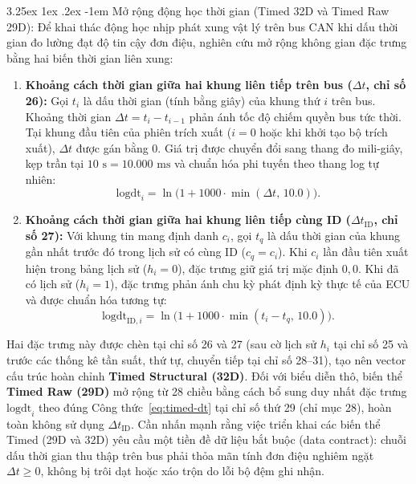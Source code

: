 \documentclass[12pt, a4paper, reqno, oneside]{book}
\makeatletter
\renewcommand\paragraph{\@startsection{paragraph}{5}{\z@}%
  {3.25ex \@plus1ex \@minus.2ex}%
  {-1em}%
  {\normalfont\normalsize\bfseries}}
\makeatother
\begin{document}
\paragraph{Mở rộng động học thời gian (Timed 32D và Timed Raw 29D):}\label{subsec:timed-features-def}
Để khai thác động học nhịp phát xung vật lý trên bus CAN khi dấu thời gian đo lường đạt độ tin cậy đơn điệu, nghiên cứu mở rộng không gian đặc trưng bằng hai biến thời gian liên xung:
\begin{enumerate}
    \item \textbf{Khoảng cách thời gian giữa hai khung liên tiếp trên bus ($\Delta t$, chỉ số 26):} Gọi $t_i$ là dấu thời gian (tính bằng giây) của khung thứ $i$ trên bus. Khoảng thời gian $\Delta t = t_i - t_{i-1}$ phản ánh tốc độ chiếm quyền bus tức thời. Tại khung đầu tiên của phiên trích xuất ($i=0$ hoặc khi khởi tạo bộ trích xuất), $\Delta t$ được gán bằng $0$. Giá trị được chuyển đổi sang thang đo mili-giây, kẹp trần tại $10\text{ s} = 10.000\text{ ms}$ và chuẩn hóa phi tuyến theo thang log tự nhiên:
    \begin{equation}\label{eq:timed-dt}
    \text{logdt}_i = \ln\big(1 + 1000 \cdot \min(\Delta t,\, 10.0)\big).
    \end{equation}
    \item \textbf{Khoảng cách thời gian giữa hai khung liên tiếp cùng ID ($\Delta t_{\text{ID}}$, chỉ số 27):} Với khung tin mang định danh $c_i$, gọi $t_q$ là dấu thời gian của khung gần nhất trước đó trong lịch sử có cùng ID ($c_q = c_i$). Khi $c_i$ lần đầu tiên xuất hiện trong bảng lịch sử ($h_i = 0$), đặc trưng giữ giá trị mặc định $0{,}0$. Khi đã có lịch sử ($h_i = 1$), đặc trưng phản ánh chu kỳ phát định kỳ thực tế của ECU và được chuẩn hóa tương tự:
    \begin{equation}\label{eq:timed-dt-id}
    \text{logdt}_{\text{ID}, i} = \ln\big(1 + 1000 \cdot \min(t_i - t_q,\, 10.0)\big).
    \end{equation}
\end{enumerate}
Hai đặc trưng này được chèn tại chỉ số 26 và 27 (sau cờ lịch sử $h_i$ tại chỉ số 25 và trước các thống kê tần suất, thứ tự, chuyển tiếp tại chỉ số 28--31), tạo nên vector cấu trúc hoàn chỉnh \textbf{Timed Structural (32D)}. Đối với biểu diễn thô, biến thể \textbf{Timed Raw (29D)} mở rộng từ 28 chiều bằng cách bổ sung duy nhất đặc trưng $\text{logdt}_i$ theo đúng Công thức~\eqref{eq:timed-dt} tại chỉ số thứ 29 (chỉ mục 28), hoàn toàn không sử dụng $\Delta t_{\text{ID}}$. Cần nhấn mạnh rằng việc triển khai các biến thể Timed (29D và 32D) yêu cầu một tiền đề dữ liệu bắt buộc (data contract): chuỗi dấu thời gian thu thập trên bus phải thỏa mãn tính đơn điệu nghiêm ngặt $\Delta t \ge 0$, không bị trôi dạt hoặc xáo trộn do lỗi bộ đệm ghi nhận.
\end{document}
